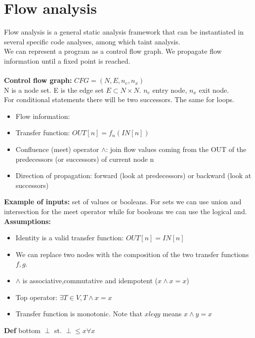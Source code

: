 \documentclass[10pt,a4paper]{book}
\begin{document}
\section{Flow analysis}
Flow analysis is a general static analysis framework that can be instantiated in several specific code analyses, among which taint analysis.\\
We can represent a program as a control flow graph. We propagate flow information until a fixed point is reached.\\\\
\textbf{Control flow graph:} $CFG = (N,E,n_e,n_x)$\\
N is a node set. E is the edge set $E \subset N \times N$. $n_e$ entry node, $n_x$ exit node.\\
For conditional statements there will be two successors. The same for loops.
\begin{itemize}
\item Flow information: 
\item Transfer function: $OUT[n]= f_n(IN[n])$
\item Confluence (meet) operator $\wedge$: join flow values coming from the OUT of the predecessors (or successors) of current node n
\item Direction of propagation: forward (look at predecessors) or backward (look at successors)
\end{itemize}
\textbf{Example of inputs:} set of values or booleans. For sets we can use union and intersection for the meet operator while for booleans we can use the logical and.\\
\textbf{Assumptions:}
\begin{itemize}
\item Identity is a valid transfer function: $OUT[n] = IN[n]$\\
\item We can replace two nodes with the composition of the two transfer functions $f,g$.\\
\item $\wedge$ is associative,commutative and idempotent ($x \wedge x = x$)\\
\item Top operator: $\exists T \in V,T \wedge x = x$\\
\item Transfer function is monotonic. Note that $x leq y$ means $x \wedge y = x$
\end{itemize}
\textbf{Def} bottom $\perp$ st. $\perp \leq x \forall x$\\
\end{document}
